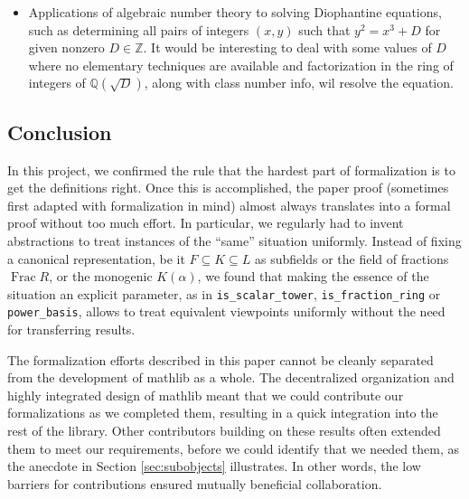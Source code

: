 \documentclass[sn-mathphys]{sn-jnl}%
\newcommand{\lean}[1]{\texttt{#1}\xspace}
\newcommand{\mathlib}{\textsf{mathlib}\xspace}
\newcommand{\QQ}{\mathbb{Q}}
\renewcommand{\Z}{\mathbb{Z}}
\DeclareMathOperator{\Frac}{Frac}
\begin{document}
\begin{itemize}
\item Applications of algebraic number theory to solving Diophantine equations, such as determining all pairs of integers $(x,y)$ such that $y^2=x^3+D$ for
given nonzero $D \in \Z$. It would be interesting to deal with some values of $D$ where no elementary techniques are available and factorization in the ring of integers of $\QQ(\sqrt{D})$, along with class number info, wil resolve the equation.

\end{itemize}

\subsection{Conclusion}

In this project, we confirmed the rule that the hardest part of formalization is to get the definitions right.
Once this is accomplished, the paper proof (sometimes first adapted with formalization in mind) almost always translates into a formal proof without too much effort.
In particular, we regularly had to invent abstractions to treat instances of the ``same'' situation uniformly.
Instead of fixing a canonical representation, be it $F \subseteq K \subseteq L$ as subfields or the field of fractions $\Frac R$, or the monogenic $K(\alpha)$, we found that making the essence of the situation an explicit parameter, as in \lean{is\_scalar\_tower}, \lean{is\_fraction\_ring} or \lean{power\_basis},
allows to treat equivalent viewpoints uniformly without the need for transferring results.

The formalization efforts described in this paper cannot be cleanly separated from the development of \mathlib as a whole.
The decentralized organization and highly integrated design of \mathlib meant that we could contribute our formalizations as we completed them, resulting in a quick integration into the rest of the library.
Other contributors building on these results often extended them to meet our requirements,
before we could identify that we needed them, as the anecdote in Section \ref{sec:subobjects} illustrates.
In other words, the low barriers for contributions ensured mutually beneficial collaboration.
\end{document}
